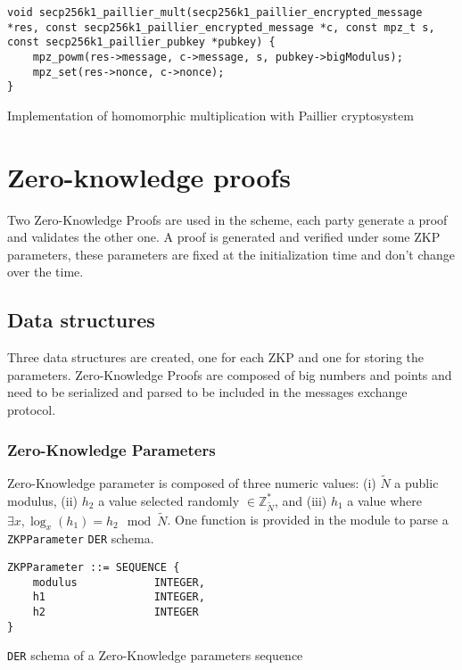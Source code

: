 \begin{listing}
  \begin{verbatim}
void secp256k1_paillier_mult(secp256k1_paillier_encrypted_message *res, const secp256k1_paillier_encrypted_message *c, const mpz_t s, const secp256k1_paillier_pubkey *pubkey) {
    mpz_powm(res->message, c->message, s, pubkey->bigModulus);
    mpz_set(res->nonce, c->nonce);
}
  \end{verbatim}
	\caption{Implementation of homomorphic multiplication with Paillier cryptosystem}
	\label{lst:implHomomorphMulPaillier}
\end{listing}


\section{Zero-knowledge proofs}

Two Zero-Knowledge Proofs are used in the scheme, each party generate a proof and
validates the other one. A proof is generated and verified under some ZKP parameters,
these parameters are fixed at the initialization time and don't change over the time.

\subsection{Data structures}

Three data structures are created, one for each ZKP and one for storing the parameters.
Zero-Knowledge Proofs are composed of big numbers and points and need to be serialized
and parsed to be included in the messages exchange protocol.

\subsubsection{Zero-Knowledge Parameters}

Zero-Knowledge parameter is composed of three numeric values: (i) $\tilde{N}$ a public modulus,
(ii) $h_2$ a value selected randomly $\in \mathbb{Z}_{\tilde{N}}^*$,
and (iii) $h_1$ a value where $\exists x, \log_x(h_1) = h_2 \mod \tilde{N}$.
One function is provided in the module to parse a \texttt{ZKPParameter} \texttt{DER} schema.

\begin{listing}
  \begin{verbatim}
ZKPParameter ::= SEQUENCE {
    modulus            INTEGER,
    h1                 INTEGER,
    h2                 INTEGER
}
  \end{verbatim}
	\caption{\texttt{DER} schema of a Zero-Knowledge parameters sequence}
	\label{lst:DERSchemaZKPParams}
\end{listing}

